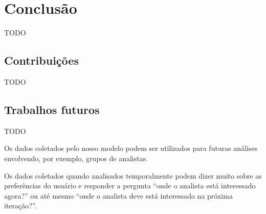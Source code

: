 \chapter{Conclusão}
\label{chap:conclusao}

TODO


\section{Contribuições}

TODO

\section{Trabalhos futuros}

TODO

Os dados coletados pelo nosso modelo podem ser utilizados para futuras análises envolvendo, por exemplo, grupos de analistas.

Os dados coletados quando analisados temporalmente podem dizer muito sobre as preferências do usuário e responder a pergunta ``onde o analista está interessado agora?'' ou até mesmo ``onde o analista deve está interessado na próxima iteração?''.